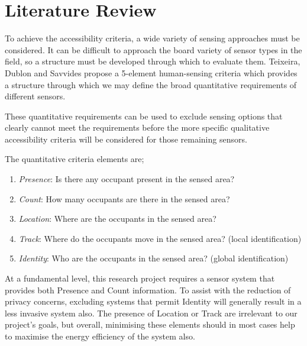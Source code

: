 \documentclass[../thesis/thesis.tex]{subfiles}
\begin{document}
\chapter{Literature Review}
\label{chap:litreview}
\label{sec:litreview:sensors}

To achieve the accessibility criteria, a wide variety of sensing approaches must be considered. It can be difficult to approach the board variety of sensor types in the field, so a structure must be developed through which to evaluate them. Teixeira, Dublon and Savvides \cite{teixeira2010survey} propose a 5-element human-sensing criteria which provides a structure through which we may define the broad quantitative requirements of different sensors.

These quantitative requirements can be used to exclude sensing options that clearly cannot meet the requirements before the more specific qualitative accessibility criteria will be considered for those remaining sensors. 

The quantitative criteria elements are;
\begin{enumerate}
 \item \emph{Presence}: Is there any occupant present in the sensed area?
 \item \emph{Count}: How many occupants are there in the sensed area?
 \item \emph{Location}: Where are the occupants in the sensed area?
 \item \emph{Track}: Where do the occupants move in the sensed area? (local identification)
 \item \emph{Identity}: Who are the occupants in the sensed area? (global identification)
\end{enumerate}

At a fundamental level, this research project requires a sensor system that provides both Presence and Count information. To assist with the reduction of privacy concerns, excluding systems that permit Identity will generally result in a less invasive system also. The presence of Location or Track are irrelevant to our project's goals, but overall, minimising these elements should in most cases help to maximise the energy efficiency of the system also.
\end{document}
